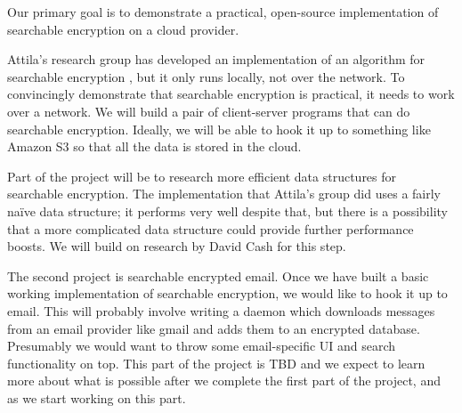 \documentclass[onecolumn, draftclsnofoot,10pt, compsoc]{IEEEtran}
\begin{document}

Our primary goal is to demonstrate a practical, open-source implementation of searchable encryption on a cloud provider.




Attila's research group has developed an implementation of an algorithm for searchable encryption \cite{yavuz17},
but it only runs locally, not over the network.
To convincingly demonstrate that searchable encryption is practical, it needs to work over a network.
We will build a pair of client-server programs that can do searchable encryption.
Ideally, we will be able to hook it up to something like Amazon S3 so that all the data is stored in the cloud.


Part of the project will be to research more efficient data structures for searchable encryption.
The implementation that Attila's group did uses a fairly na\"ive data structure;
it performs very well despite that, but there is a possibility that a more complicated data structure could provide further performance boosts.
We will build on research by David Cash for this step.
\cite{cryptoeprint:2014:853}



The second project is searchable encrypted email.
Once we have built a basic working implementation of searchable encryption,
we would like to hook it up to email.
This will probably involve writing a daemon which downloads messages from an email provider like gmail
and adds them to an encrypted database.
Presumably we would want to throw some email-specific UI and search functionality on top.
This part of the project is TBD and we expect to learn more about what is possible after we complete the first part of the project, and as we start working on this part.
\end{document}
